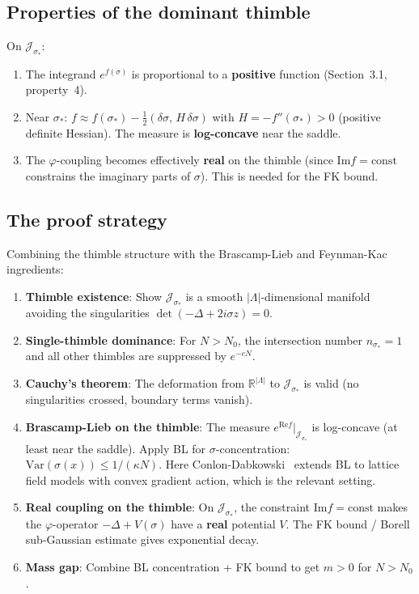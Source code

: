 \documentclass[12pt]{article}
\theoremstyle{definition}
\theoremstyle{remark}
\newcommand{\R}{\mathbb{R}}
\newcommand{\Var}{\mathrm{Var}}
\newcommand{\ph}{\varphi}
\newcommand{\La}{\Lambda}
\newcommand{\im}{\mathrm{Im}}
\newcommand{\re}{\mathrm{Re}}
\begin{document}
\subsection{Properties of the dominant thimble}

On $\mathcal{J}_{\sigma_*}$:
\begin{enumerate}
\item The integrand $e^{f(\sigma)}$ is proportional to a
  \textbf{positive} function (Section~3.1, property~4).
\item Near $\sigma_*$: $f \approx f(\sigma_*) - \tfrac{1}{2}
  (\delta\sigma,\,H\,\delta\sigma)$ with $H = -f''(\sigma_*) > 0$
  (positive definite Hessian). The measure is \textbf{log-concave}
  near the saddle.
\item The $\ph$-coupling becomes effectively \textbf{real} on the
  thimble (since $\im f = \text{const}$ constrains the imaginary
  parts of $\sigma$). This is needed for the FK bound.
\end{enumerate}

\subsection{The proof strategy}

Combining the thimble structure with the Brascamp-Lieb and
Feynman-Kac ingredients:

\begin{enumerate}
\item \textbf{Thimble existence}: Show $\mathcal{J}_{\sigma_*}$ is a
  smooth $|\La|$-dimensional manifold avoiding the singularities
  $\det(-\Delta+2i\sigma z) = 0$.
\item \textbf{Single-thimble dominance}: For $N > N_0$, the
  intersection number $n_{\sigma_*} = 1$ and all other thimbles
  are suppressed by $e^{-cN}$.
\item \textbf{Cauchy's theorem}: The deformation from $\R^{|\La|}$
  to $\mathcal{J}_{\sigma_*}$ is valid (no singularities crossed,
  boundary terms vanish).
\item \textbf{Brascamp-Lieb on the thimble}: The measure
  $e^{\re f}|_{\mathcal{J}_{\sigma_*}}$ is log-concave (at least
  near the saddle). Apply BL for $\sigma$-concentration:
  $\Var(\sigma(x)) \le 1/(\kappa N)$.
  Here Conlon-Dabkowski~\cite{CD24} extends BL to lattice field
  models with convex gradient action, which is the relevant setting.
\item \textbf{Real coupling on the thimble}: On
  $\mathcal{J}_{\sigma_*}$, the constraint $\im f = \text{const}$
  makes the $\ph$-operator $-\Delta + V(\sigma)$ have a \textbf{real}
  potential $V$. The FK bound / Borell sub-Gaussian estimate gives
  exponential decay.
\item \textbf{Mass gap}: Combine BL concentration + FK bound to
  get $m > 0$ for $N > N_0$.
\end{enumerate}
\end{document}
